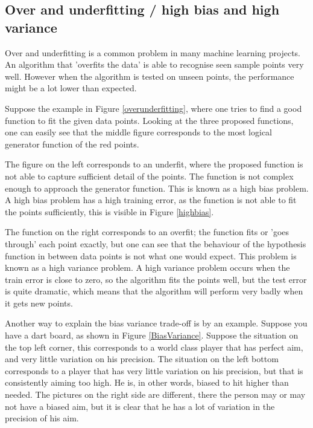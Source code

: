 \subsection{Over and underfitting / high bias and high variance}

Over and underfitting is a common problem in many machine learning projects. An algorithm that 'overfits the data' is able to recognise seen sample points very well. However when the algorithm is tested on unseen points, the performance might be a lot lower than expected.


Suppose the example in Figure \ref{overunderfitting}, where one tries to find a good function to fit the given data points. Looking at the three proposed functions, one can easily see that the middle figure corresponds to the most logical generator function of the red points. 

\npar

The figure on the left corresponds to an underfit, where the proposed function is not able to capture sufficient detail of the points. The function is not complex enough to approach the generator function. This is known as a high bias problem. A high bias problem has a high training error, as the function is not able to fit the points sufficiently, this is visible in Figure \ref{highbias}.


The function on the right corresponds to an overfit; the function fits or 'goes through' each point exactly, but one can see that the behaviour of the hypothesis function in between data points is not what one would expect. This problem is known as a high variance problem. A high variance problem occurs when the train error is close to zero, so the algorithm fits the points well, but the test error is quite dramatic, which means that the algorithm will perform very badly when it gets new points. 


Another way to explain the bias variance trade-off is by an example. Suppose you have a dart board, as shown in Figure \ref{BiasVariance}. Suppose the situation on the top left corner, this corresponds to a world class player that has perfect aim, and very little variation on his precision. The situation on the left bottom corresponds to a player that has very little variation on his precision, but that is consistently aiming too high. He is, in other words, biased to hit higher than needed. The pictures on the right side are different, there the person may or may not have a biased aim, but it is clear that he has a lot of variation in the precision of his aim.

